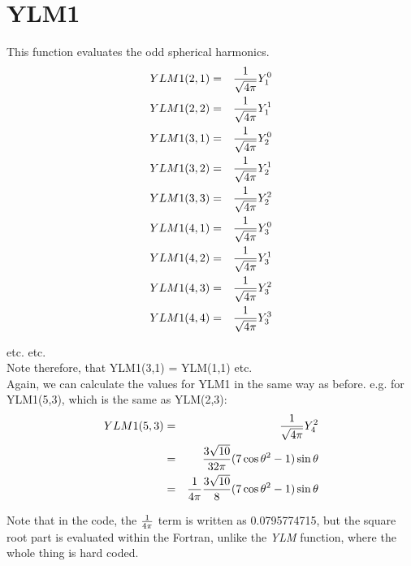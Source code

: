 \section{YLM1}
\label{sect:ylm1}

\noindent This function evaluates the odd spherical harmonics.\\

\begin{eqnarray}
YLM1(2,1)&=&{1 \over \sqrt{4 \pi}} Y_1^0\nonumber\\
YLM1(2,2)&=&{1 \over \sqrt{4 \pi}} Y_1^1\nonumber\\
YLM1(3,1)&=&{1 \over \sqrt{4 \pi}} Y_2^0\nonumber\\
YLM1(3,2)&=&{1 \over \sqrt{4 \pi}} Y_2^1\nonumber\\
YLM1(3,3)&=&{1 \over \sqrt{4 \pi}} Y_2^2\nonumber\\
YLM1(4,1)&=&{1 \over \sqrt{4 \pi}} Y_3^0\nonumber\\
YLM1(4,2)&=&{1 \over \sqrt{4 \pi}} Y_3^1\nonumber\\
YLM1(4,3)&=&{1 \over \sqrt{4 \pi}} Y_3^2\nonumber\\
YLM1(4,4)&=&{1 \over \sqrt{4 \pi}} Y_3^3\nonumber\\
\end{eqnarray}

etc. etc.\\

Note therefore, that YLM1(3,1) = YLM(1,1) etc.\\

Again, we can calculate the values for YLM1 in the same way as before. e.g.
for YLM1(5,3), which is the same as YLM(2,3):\\

\begin{eqnarray}
YLM1(5,3)&=&{1 \over \sqrt{4 \pi}} Y_4^2\nonumber\\
         &=&{3 \sqrt{10} \over 32 \pi} (7 \cos\theta^2 - 1) \sin\theta\nonumber\\
         &=&{1 \over 4 \pi} {3 \sqrt{10} \over 8} (7 \cos\theta^2 - 1)
	 \sin\theta\nonumber\\
\end{eqnarray}

Note that in the code, the ${1 \over 4 \pi}$ term is written as
0.0795774715, but the square root part is evaluated within the Fortran,
unlike the {\em YLM} function, where the whole thing is hard coded.\\

